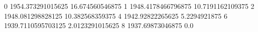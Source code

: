 0 1954.373291015625 16.674560546875
1 1948.4178466796875 10.7191162109375
2 1948.081298828125 10.382568359375
4 1942.92822265625 5.2294921875
6 1939.7110595703125 2.0123291015625
8 1937.69873046875 0.0
